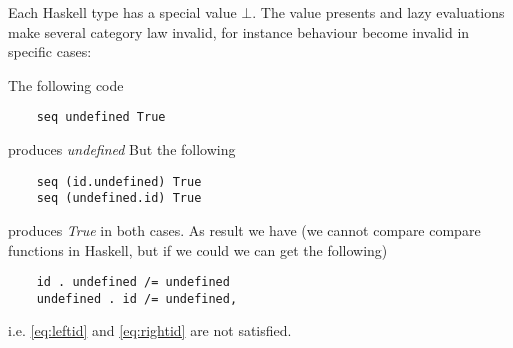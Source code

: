 \begin{remark}
  Each Haskell type has a special value $\bot$. The value presents
  and lazy evaluations make several category law invalid, for instance
   behaviour become invalid in specific cases:

  The following code
  \begin{verbatim}
    seq undefined True
  \end{verbatim}
  produces \textit{undefined}
  But the following
  \begin{verbatim}
    seq (id.undefined) True
    seq (undefined.id) True
  \end{verbatim}
  produces \textit{True} in both cases.
  As result we have
  (we cannot compare compare functions in Haskell, but if we
  could we can get the following)
  \begin{verbatim}
    id . undefined /= undefined
    undefined . id /= undefined,
  \end{verbatim}
  i.e. \eqref{eq:leftid} and
  \eqref{eq:rightid} are not satisfied.  
\end{remark}

